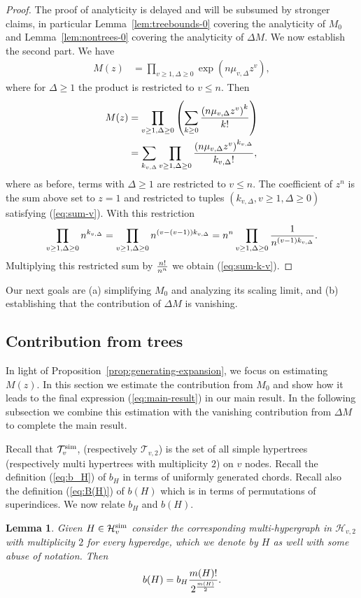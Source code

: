 \documentclass[12pt]{article}
\newtheorem{lemma}[theorem]{Lemma}
\newcommand{\cH}{\mathcal{H}}
\newcommand{\cT}{\mathcal{T}}
\begin{document}
\begin{proof}
The proof of analyticity is delayed and will be subsumed by stronger claims, in particular Lemma~\ref{lem:treebounds-0} covering 
the analyticity of $M_0$ and Lemma~\ref{lem:nontrees-0} covering the analyticity of $\Delta M$.
We now establish the second part. We have
\begin{align*}
M(z)&= \prod_{v\ge 1,\Delta\ge 0}\exp\left(n \mu_{v,\Delta}z^{v}\right),
\end{align*}
where for $\Delta\ge 1$ the product is restricted to $v\le n$. Then
\begin{align*}
M(z)
&=
\prod_{v\ge 1,\Delta\ge 0}\left(\sum_{k\ge 0} {\left(n\mu_{v,\Delta}z^{v}\right)^k\over k!}\right) \\
&=
\sum_{k_{v,\Delta}}\prod_{v\ge 1,\Delta\ge 0}{\left(n\mu_{v,\Delta}z^{v}\right)^{k_{v,\Delta}}\over k_{v,\Delta}!},
\end{align*}
where as before, terms with $\Delta\ge 1$ are restricted to $v\le n$.
The coefficient of $z^n$ is the sum above set to $z=1$ and restricted to tuples $(k_{v,\Delta}, v\ge 1,\Delta\ge 0)$ satisfying (\ref{eq:sum-v}).
With this restriction 
\begin{align*}
\prod_{v\ge 1,\Delta\ge 0} n^{k_{v,\Delta}}=\prod_{v\ge 1,\Delta\ge 0} n^{(v-(v-1))k_{v,\Delta}}=n^n \prod_{v\ge 1,\Delta\ge 0}{1\over n^{(v-1)k_{v,\Delta}}}.
\end{align*}
Multiplying this restricted sum by $n!\over n^n$ we obtain (\ref{eq:sum-k-v}).
\end{proof}
Our next goals are (a)  simplifying $M_0$ and analyzing its scaling limit,  and (b) establishing that the contribution of $\Delta M$ is vanishing.




\subsection{Contribution from trees}
In light of Proposition~\ref{prop:generating-expansion}, we focus on estimating $M(z)$. In this section we estimate the contribution from $M_0$
and show how it leads to the final expression (\ref{eq:main-result}) in our main result. In the following subsection we combine this estimation
with the vanishing contribution from $\Delta M$ to complete the main result.


Recall that $\cT_v^{\rm sim}$, (respectively $\cT_{v,2}$)  is the set of all  simple hypertrees  
(respectively multi hypertrees with multiplicity $2$)   on $v$ nodes. 
Recall  the definition (\ref{eq:b_H}) of $b_H$ in terms of uniformly generated chords. 
Recall also the definition (\ref{eq:B(H)}) of  $b(H)$ which is in terms of permutations of superindices. 
 We now relate $b_H$ and $b(H)$.
\begin{lemma}\label{lemma:b_v-vs-b(H)}
Given  $H\in \cH_v^{\rm sim}$ consider the corresponding multi-hypergraph in $\cH_{v,2}$ with  multiplicity $2$ for every hyperedge,  
which we denote by $H$ as well with some abuse of notation.  Then 
\begin{align}
b(H)=b_H {m(H) ! \over 2^{m(H) \over 2}}. \label{eq:bvsb}
\end{align}
\end{lemma}
\end{document}
